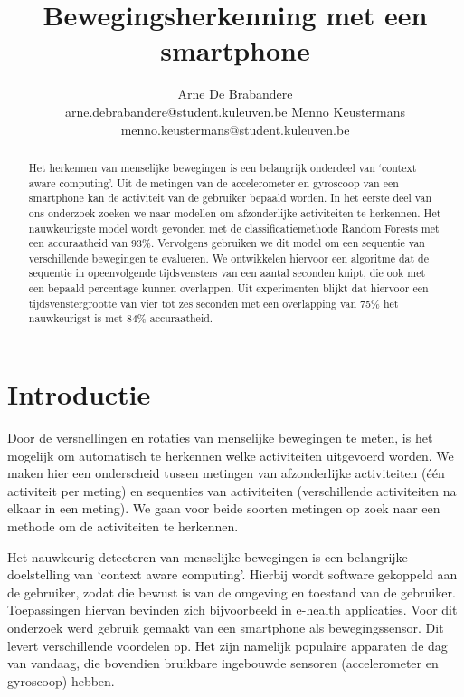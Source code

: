 \documentclass{article}
\title{Bewegingsherkenning met een smartphone}
\author{Arne De Brabandere\\
	arne.debrabandere@student.kuleuven.be
    \And
    Menno Keustermans\\
    menno.keustermans@student.kuleuven.be}
\begin{document}
\maketitle

\begin{abstract}

Het herkennen van menselijke bewegingen is een belangrijk onderdeel van `context aware computing'. Uit de metingen van de accelerometer en gyroscoop van een smartphone kan de activiteit van de gebruiker bepaald worden. In het eerste deel van ons onderzoek zoeken we naar modellen om afzonderlijke activiteiten te herkennen. Het nauwkeurigste model wordt gevonden met de classificatiemethode Random Forests met een accuraatheid van 93\%. Vervolgens gebruiken we dit model om een sequentie van verschillende bewegingen te evalueren. We ontwikkelen hiervoor een algoritme dat de sequentie in opeenvolgende tijdsvensters van een aantal seconden knipt, die ook met een bepaald percentage kunnen overlappen. Uit experimenten blijkt dat hiervoor een tijdsvenstergrootte van vier tot zes seconden met een overlapping van 75\% het nauwkeurigst is met 84\% accuraatheid.

\end{abstract}

\section{Introductie}

Door de versnellingen en rotaties van menselijke bewegingen te meten, is het mogelijk om automatisch te herkennen welke activiteiten uitgevoerd worden. We maken hier een onderscheid tussen metingen van afzonderlijke activiteiten (\'e\'en activiteit per meting) en sequenties van activiteiten (verschillende activiteiten na elkaar in een meting). We gaan voor beide soorten metingen op zoek naar een methode om de activiteiten te herkennen.

Het nauwkeurig detecteren van menselijke bewegingen is een belangrijke doelstelling van `context aware computing'. Hierbij wordt software gekoppeld aan de gebruiker, zodat die bewust is van de omgeving en toestand van de gebruiker. Toepassingen hiervan bevinden zich bijvoorbeeld in e-health applicaties. Voor dit onderzoek werd gebruik gemaakt van een smartphone als bewegingssensor. Dit levert verschillende voordelen op. Het zijn namelijk populaire apparaten de dag van vandaag, die bovendien bruikbare ingebouwde sensoren (accelerometer en gyroscoop) hebben.
\end{document}
